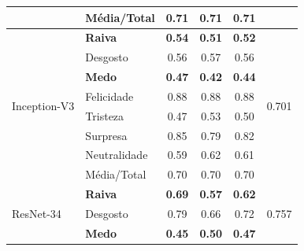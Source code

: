 \documentclass{beamer}
\begin{document}
\begin{frame}
\begin{table}[]
\begin{tabular}{llcccc}
                                    & Média/Total           & 0.71              & 0.71               & 0.71              &                                 \\ \hline
\multirow{8}{*}{Inception-V3}       & \scriptsize \textbf{Raiva}                 & \scriptsize \textbf{0.54}              & \scriptsize \textbf{0.51}               & \scriptsize \textbf{0.52}              & \multirow{8}{*}{0.701}          \\
                                    & Desgosto              & 0.56              & 0.57               & 0.56              &                                 \\
                                    & \scriptsize \textbf{Medo}                  & \scriptsize \textbf{0.47}              & \scriptsize \textbf{0.42}               & \scriptsize \textbf{0.44}              &                                 \\
                                    & Felicidade            & 0.88              & 0.88               & 0.88              &                                 \\
                                    & Tristeza              & 0.47              & 0.53               & 0.50              &                                 \\
                                    & Surpresa              & 0.85              & 0.79               & 0.82              &                                 \\
                                    & Neutralidade          & 0.59              & 0.62               & 0.61              &                                 \\
                                    & Média/Total           & 0.70              & 0.70               & 0.70              &                                 \\ \hline
\multirow{8}{*}{ResNet-34} & \scriptsize \textbf{Raiva}        & \scriptsize \textbf{0.69}     & \scriptsize \textbf{0.57}      & \scriptsize \textbf{0.62}     & \multirow{8}{*}{0.757} \\
                                    & Desgosto     & 0.79     & 0.66      & 0.72     &                                 \\
                                    & \scriptsize \textbf{Medo}         & \scriptsize \textbf{0.45}     & \scriptsize \textbf{0.50}      & \scriptsize \textbf{0.47}     &                                 \\

\end{tabular}
\end{table}
\end{frame}
\end{document}
